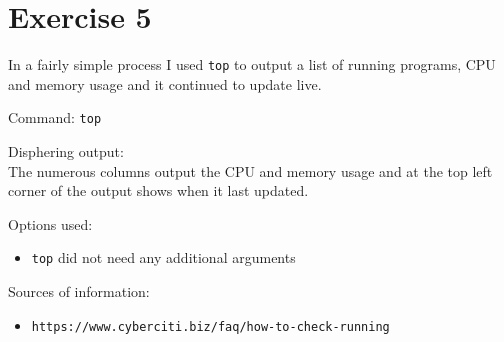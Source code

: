 \documentclass{article}
\begin{document}
\newpage
\section{Exercise 5}
In a fairly simple process I used \texttt{top} to output a list of running programs, CPU and memory usage and it continued to update live. 

Command: \texttt{top}

Disphering output:\\
The numerous columns output the CPU and memory usage and at the top left corner of the output shows when it last updated.  

Options used:
\begin{itemize}
    \item{\texttt{top} did not need any additional arguments }
\end{itemize}

Sources of information:
\begin{itemize}
    \item{\texttt{https://www.cyberciti.biz/faq/how-to-check-running}}
\end{itemize}
\end{document}
